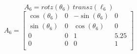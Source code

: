 \documentclass[12pt]{report}
\begin{document}
\begin{minipage}[c]{.5\textwidth}
\[
A_6 = rotz(\theta_6) ~ transz(\ell_6)
\]
\vspace{.5ex}
\[
A_6 =
\begin{bmatrix}
  \cos(\theta_6) & 0 & -\sin(\theta_6) & 0 \\
  \sin(\theta_6) & 0 & \cos(\theta_6) & 0 \\
  0 & 0 & 1 & 5.25 \\
  0 & 0 & 0 & 1 \\
\end{bmatrix}
\]
\vfill\null
\end{minipage}






\end{document}
